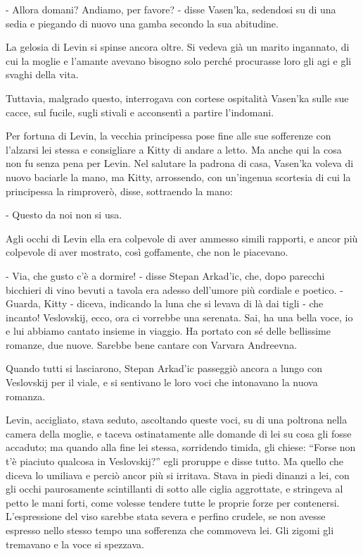 - Allora domani? Andiamo, per favore? - disse Vasen'ka, sedendosi su di una sedia e piegando di nuovo una gamba secondo la sua abitudine. 

La gelosia di Levin si spinse ancora oltre. Si vedeva già un marito ingannato, di cui la moglie e l'amante avevano bisogno solo perché procurasse loro gli agi e gli svaghi della vita. 

Tuttavia, malgrado questo, interrogava con cortese ospitalità Vasen'ka sulle sue cacce, sul fucile, sugli stivali e acconsentì a partire l'indomani. 

Per fortuna di Levin, la vecchia principessa pose fine alle sue sofferenze con l'alzarsi lei stessa e consigliare a Kitty di andare a letto. Ma anche qui la cosa non fu senza pena per Levin. Nel salutare la padrona di casa, Vasen'ka voleva di nuovo baciarle la mano, ma Kitty, arrossendo, con un'ingenua scortesia di cui la principessa la rimproverò, disse, sottraendo la mano: 

- Questo da noi non si usa. 

Agli occhi di Levin ella era colpevole di aver ammesso simili rapporti, e ancor più colpevole di aver mostrato, così goffamente, che non le piacevano. 

- Via, che gusto c'è a dormire! - disse Stepan Arkad'ic, che, dopo parecchi bicchieri di vino bevuti a tavola era adesso dell'umore più cordiale e poetico. - Guarda, Kitty - diceva, indicando la luna che si levava di là dai tigli - che incanto! Veslovskij, ecco, ora ci vorrebbe una serenata. Sai, ha una bella voce, io e lui abbiamo cantato insieme in viaggio. Ha portato con sé delle bellissime romanze, due nuove. Sarebbe bene cantare con Varvara Andreevna. 

Quando tutti si lasciarono, Stepan Arkad'ic passeggiò ancora a lungo con Veslovskij per il viale, e si sentivano le loro voci che intonavano la nuova romanza. 

Levin, accigliato, stava seduto, ascoltando queste voci, su di una poltrona nella camera della moglie, e taceva ostinatamente alle domande di lei su cosa gli fosse accaduto; ma quando alla fine lei stessa, sorridendo timida, gli chiese: ``Forse non t'è piaciuto qualcosa in Veslovskij?'' egli proruppe e disse tutto. Ma quello che diceva lo umiliava e perciò ancor più si irritava. Stava in piedi dinanzi a lei, con gli occhi paurosamente scintillanti di sotto alle ciglia aggrottate, e stringeva al petto le mani forti, come volesse tendere tutte le proprie forze per contenersi. L'espressione del viso sarebbe stata severa e perfino crudele, se non avesse espresso nello stesso tempo una sofferenza che commoveva lei. Gli zigomi gli tremavano e la voce si spezzava. 

